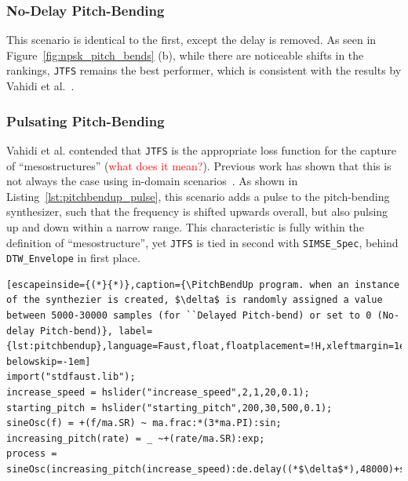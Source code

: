 \documentclass[runningheads]{llncs}
\newcommand{\todo}[1]{\textcolor{red}{#1}}
\newcommand{\SIMSESpec}{\texttt{SIMSE\_Spec}\xspace}
\newcommand{\JTFS}{\texttt{JTFS}\xspace}
\newcommand{\DTWEnv}{\texttt{DTW\_Envelope}\xspace}
\newcommand{\PitchBendUp}{\textbf{PitchBend-Up}\xspace}
\begin{document}
\subsubsection{No-Delay Pitch-Bending}
This scenario is identical to the first, except the delay is removed. As seen in Figure~\ref{fig:npsk_pitch_bends} (b), while there are noticeable shifts in the rankings, \JTFS remains the best performer, which is consistent with the results by Vahidi et al.~\cite{vahidi2023mesostructures}.

\subsubsection{Pulsating Pitch-Bending}
Vahidi et al. contended that \JTFS is the appropriate loss function for the capture of ``mesostructures'' (\todo{what does it mean?}). Previous work has shown that this is not always the case using in-domain scenarios~\cite{salimi2025soundmatching}. As shown in Listing~\ref{lst:pitchbendup_pulse}, this scenario adds a pulse to the pitch-bending synthesizer, such that the frequency is shifted upwards overall, but also pulsing up and down within a narrow range. This characteristic is fully within the definition of ``mesostructure'', yet \JTFS is tied in second with \SIMSESpec, behind \DTWEnv in first place. 





\begin{lstlisting}[escapeinside={(*}{*)},caption={\PitchBendUp program. when an instance of the synthezier is created, $\delta$ is randomly assigned a value between 5000-30000 samples (for ``Delayed Pitch-bend) or set to 0 (No-delay Pitch-bend)}, label={lst:pitchbendup},language=Faust,float,floatplacement=!H,xleftmargin=1em,xrightmargin=0.5em,firstnumber=0,aboveskip=0em, belowskip=-1em]
import("stdfaust.lib");
increase_speed = hslider("increase_speed",2,1,20,0.1);
starting_pitch = hslider("starting_pitch",200,30,500,0.1);
sineOsc(f) = +(f/ma.SR) ~ ma.frac:*(3*ma.PI):sin;
increasing_pitch(rate) = _ ~+(rate/ma.SR):exp;
process = sineOsc(increasing_pitch(increase_speed):de.delay((*$\delta$*),48000)+starting_pitch);

\end{lstlisting}
\end{document}
